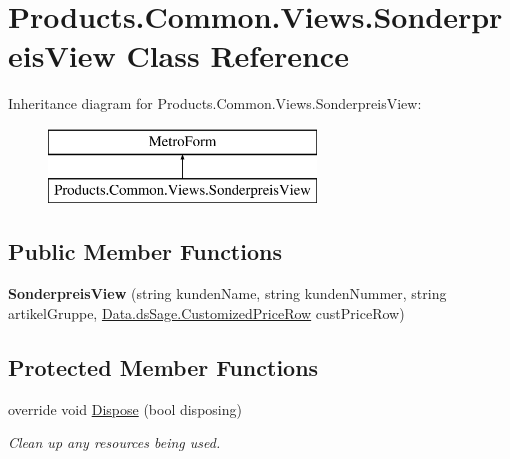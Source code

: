 \hypertarget{class_products_1_1_common_1_1_views_1_1_sonderpreis_view}{}\section{Products.\+Common.\+Views.\+Sonderpreis\+View Class Reference}
\label{class_products_1_1_common_1_1_views_1_1_sonderpreis_view}
Inheritance diagram for Products.\+Common.\+Views.\+Sonderpreis\+View\+:\begin{figure}[H]
\begin{center}
\leavevmode
\includegraphics[height=2.000000cm]{class_products_1_1_common_1_1_views_1_1_sonderpreis_view}
\end{center}
\end{figure}
\subsection*{Public Member Functions}
\begin{DoxyCompactItemize}
\item 
{\bfseries Sonderpreis\+View} (string kunden\+Name, string kunden\+Nummer, string artikel\+Gruppe, \hyperlink{class_products_1_1_data_1_1ds_sage_1_1_customized_price_row}{Data.\+ds\+Sage.\+Customized\+Price\+Row} cust\+Price\+Row)\hypertarget{class_products_1_1_common_1_1_views_1_1_sonderpreis_view_a25295fce20cbe7dcf85d4883dad6ea5a}{}\label{class_products_1_1_common_1_1_views_1_1_sonderpreis_view_a25295fce20cbe7dcf85d4883dad6ea5a}

\end{DoxyCompactItemize}
\subsection*{Protected Member Functions}
\begin{DoxyCompactItemize}
\item 
override void \hyperlink{class_products_1_1_common_1_1_views_1_1_sonderpreis_view_a6ba9541459f392990b9ac955b709da91}{Dispose} (bool disposing)
\begin{DoxyCompactList}\small\item\em Clean up any resources being used. \end{DoxyCompactList}\end{DoxyCompactItemize}


